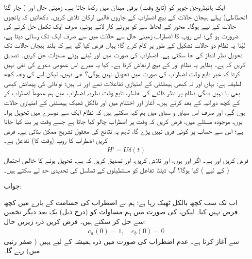 ایک ہائیڈروجن جوہر کو (تابع وقت) برقی میدان  میں رکھا جاتا ہے۔ زمینی حال  اور ( چار گنا انحطاطی) پہلے ہیجان حالات  کے بیچ اضطراب  کے چاروں قالبی ارکان  تلاش کریں۔ دکھائیں کہ پانچوں حالات کے لیے  ہوگا۔  محور  کے لحاظ سے  کو بروئے کار لاتے ہوئے، صرف ایک تکمل حل کرنے کی ضرورت ہو گی؛ اس روپ کا اضطراب زمینی حال سے  حالات میں سے صرف ایک تک رسائی دیتا ہے، لہٰذا یہ نظام دو حالات تشکیل کے طور پر کام کرے گا؛ یہاں فرض کیا گیا ہے کہ بلند ہیجان حالات تک تحویل نظر انداز کی جا سکتی ہے۔
 اضطراب کی صورت میں  اور  لیتے ہوئے مساوات  حل کریں۔ تصدیق کریں کہ  ہے۔  بظاہر یہ نظام  اور  کے بیچ ارتعاش کرتا ہے۔ کیا یہ میرے اس عمومی دعوے کی نفی نہیں کرتا کہ غیر تابع وقت اضطراب کی صورت میں تحویل نہیں ہوگی؟ جی نہیں، لیکن اس کی وجہ کچھ لطیف ہے: یہاں  اور  نہ کبھی ہیملٹنی کے امتیازی تفاعلات تھے اور نہ ہیں؛ توانائی کی پیمائش کبھی بھی  یا  نہیں دیگی۔نظام پر نظر ڈالنے کی خاطر، تابع وقت نظریہ اضطراب میں ہم عموماً اضطراب  کر کے کچھ دورانیہ کے بعد  کرتے ہیں۔ آغاز اور اختتام میں  اور  بالکل ٹھیک ہیملٹنی کے امتیازی حالات ہوں گے، اور صرف اس سیاق و سباق میں ہم کہہ سکتے ہیں کہ نظام ایک سے دوسرے میں تحویل ہوا۔ یوں، موجودہ مسئلے میں، فرض کریں کہ وقت  پر اضطراب چالو کیا جاتا ہے جسے وقت  پر بند کیا جاتا ہے؛ اس سے حساب پر کوئی فرق نہیں پڑے گا، تاہم یہ نتائج کی معقول تشریح ممکن بناتی ہے۔
فرض کریں اضطراب کا روپ (وقت کا)  تفاعل ہے۔
\begin{align*}
	H'=U\delta(t) 
\end{align*}
فرض کریں  اور  ہے۔ اگر  اور  ہوں،  اور  تلاش کریں، اور تصدیق کریں کہ  ہے۔ تحویل ہونے کا خالص احتمال (  کے لیے ) کیا ہوگا؟  آپ ڈیلٹا تفاعل کو مستطیلوں کے تسلسل کی تحدیدی حد لے سکتے ہیں۔

جواب:  


اب تک سب کچھ بالکل ٹھیک رہا ہے: ہم نے اضطراب کی جسامت کے بارے میں کچھ فرض نہیں کیا۔ لیکن،   کی صورت میں ہم مساوات  کو (درج ذیل) یک بعد دیگر تخمین سے حل کر سکتے ہیں۔ فرض کریں ذرہ زیریں حال:
\begin{align}
	c_a(0)=1,\quad c_b(0)=0
\end{align}
سے آغاز کرتا ہے۔ عدم اضطراب کی صورت میں ذرہ ہمیشہ کے لیے یہیں ( صفر رتبی میں) رہے گا۔

